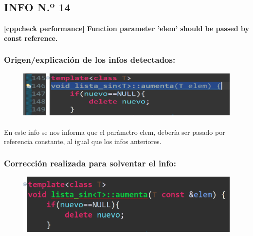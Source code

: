 	\subsection{ INFO N.º 14}
	
		\paragraph{[cppcheck performance] Function parameter 'elem' should be passed by const reference.}
	
		\subsubsection{Origen/explicación de los infos detectados:}
		
			\begin{figure}[H]
				\centering
				\includegraphics[scale=0.55]{img/esteban20.png}
				\label{esteban20}
			\end{figure}
		
			\paragraph{}En este info se nos informa que el parámetro elem, debería ser pasado por referencia constante, al igual que los infos anteriores.
			
		\subsubsection{Corrección realizada para solventar el info:}
		
			\begin{figure}[H]
				\centering
				\includegraphics[scale=0.55]{img/esteban21.png}
				\label{esteban21}
			\end{figure}
		
